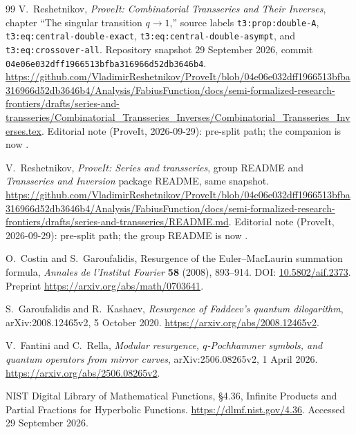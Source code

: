 \documentclass[11pt,a4paper]{article}
\theoremstyle{definition}
\theoremstyle{remark}
\begin{document}
\begin{thebibliography}{99}
V.~Reshetnikov, \emph{ProveIt: Combinatorial Transseries and Their Inverses},
chapter ``The singular transition $q\to1$,'' source labels
\texttt{t3:prop:double-A}, \texttt{t3:eq:central-double-exact},
\texttt{t3:eq:central-double-asympt}, and \texttt{t3:eq:crossover-all}.
Repository snapshot 29 September 2026, commit
\texttt{04e06e032dff1966513bfba316966d52db3646b4}.
\url{https://github.com/VladimirReshetnikov/ProveIt/blob/04e06e032dff1966513bfba316966d52db3646b4/Analysis/FabiusFunction/docs/semi-formalized-research-frontiers/drafts/series-and-transseries/Combinatorial_Transseries_Inverses/Combinatorial_Transseries_Inverses.tex}.
Editorial note (ProveIt, 2026-09-29): pre-split path; the companion is now
.

V.~Reshetnikov, \emph{ProveIt: Series and transseries}, group README and
\emph{Transseries and Inversion} package README, same snapshot.
\url{https://github.com/VladimirReshetnikov/ProveIt/blob/04e06e032dff1966513bfba316966d52db3646b4/Analysis/FabiusFunction/docs/semi-formalized-research-frontiers/drafts/series-and-transseries/README.md}.
Editorial note (ProveIt, 2026-09-29): pre-split path; the group README is now
.

O.~Costin and S.~Garoufalidis, Resurgence of the Euler--MacLaurin summation
formula, \emph{Annales de l'Institut Fourier} \textbf{58} (2008), 893--914.
DOI: \href{https://doi.org/10.5802/aif.2373}{10.5802/aif.2373}.
Preprint \url{https://arxiv.org/abs/math/0703641}.

S.~Garoufalidis and R.~Kashaev, \emph{Resurgence of Faddeev's quantum
dilogarithm}, arXiv:2008.12465v2, 5 October 2020.
\url{https://arxiv.org/abs/2008.12465v2}.

V.~Fantini and C.~Rella, \emph{Modular resurgence, $q$-Pochhammer symbols,
and quantum operators from mirror curves}, arXiv:2506.08265v2,
1 April 2026. \url{https://arxiv.org/abs/2506.08265v2}.

NIST Digital Library of Mathematical Functions, \S4.36,
Infinite Products and Partial Fractions for Hyperbolic Functions.
\url{https://dlmf.nist.gov/4.36}. Accessed 29 September 2026.


\end{thebibliography}
\end{document}
